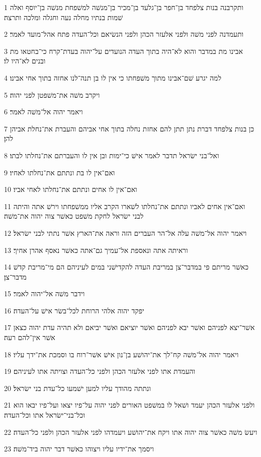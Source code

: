 \par 1 ותקרבנה בנות צלפחד בן־חפר בן־גלעד בן־מכיר בן־מנשׁה למשׁפחת מנשׁה בן־יוסף ואלה שׁמות בנתיו מחלה נעה וחגלה ומלכה ותרצה׃
\par 2 ותעמדנה לפני משׁה ולפני אלעזר הכהן ולפני הנשׂיאם וכל־העדה פתח אהל־מועד לאמר׃
\par 3 אבינו מת במדבר והוא לא־היה בתוך העדה הנועדים על־יהוה בעדת־קרח כי־בחטאו מת ובנים לא־היו לו׃
\par 4 למה יגרע שׁם־אבינו מתוך משׁפחתו כי אין לו בן תנה־לנו אחזה בתוך אחי אבינו׃
\par 5 ויקרב משׁה את־משׁפטן לפני יהוה׃
\par 6 ויאמר יהוה אל־משׁה לאמר׃
\par 7 כן בנות צלפחד דברת נתן תתן להם אחזת נחלה בתוך אחי אביהם והעברת את־נחלת אביהן להן׃
\par 8 ואל־בני ישׂראל תדבר לאמר אישׁ כי־ימות ובן אין לו והעברתם את־נחלתו לבתו׃
\par 9 ואם־אין לו בת ונתתם את־נחלתו לאחיו׃
\par 10 ואם־אין לו אחים ונתתם את־נחלתו לאחי אביו׃
\par 11 ואם־אין אחים לאביו ונתתם את־נחלתו לשׁארו הקרב אליו ממשׁפחתו וירשׁ אתה והיתה לבני ישׂראל לחקת משׁפט כאשׁר צוה יהוה את־משׁה׃
\par 12 ויאמר יהוה אל־משׁה עלה אל־הר העברים הזה וראה את־הארץ אשׁר נתתי לבני ישׂראל׃
\par 13 וראיתה אתה ונאספת אל־עמיך גם־אתה כאשׁר נאסף אהרן אחיך׃
\par 14 כאשׁר מריתם פי במדבר־צן במריבת העדה להקדישׁני במים לעיניהם הם מי־מריבת קדשׁ מדבר־צן׃
\par 15 וידבר משׁה אל־יהוה לאמר׃
\par 16 יפקד יהוה אלהי הרוחת לכל־בשׂר אישׁ על־העדה׃
\par 17 אשׁר־יצא לפניהם ואשׁר יבא לפניהם ואשׁר יוציאם ואשׁר יביאם ולא תהיה עדת יהוה כצאן אשׁר אין־להם רעה׃
\par 18 ויאמר יהוה אל־משׁה קח־לך את־יהושׁע בן־נון אישׁ אשׁר־רוח בו וסמכת את־ידך עליו׃
\par 19 והעמדת אתו לפני אלעזר הכהן ולפני כל־העדה וצויתה אתו לעיניהם׃
\par 20 ונתתה מהודך עליו למען ישׁמעו כל־עדת בני ישׂראל׃
\par 21 ולפני אלעזר הכהן יעמד ושׁאל לו במשׁפט האורים לפני יהוה על־פיו יצאו ועל־פיו יבאו הוא וכל־בני־ישׂראל אתו וכל־העדה׃
\par 22 ויעשׂ משׁה כאשׁר צוה יהוה אתו ויקח את־יהושׁע ויעמדהו לפני אלעזר הכהן ולפני כל־העדה׃
\par 23 ויסמך את־ידיו עליו ויצוהו כאשׁר דבר יהוה ביד־משׁה׃

